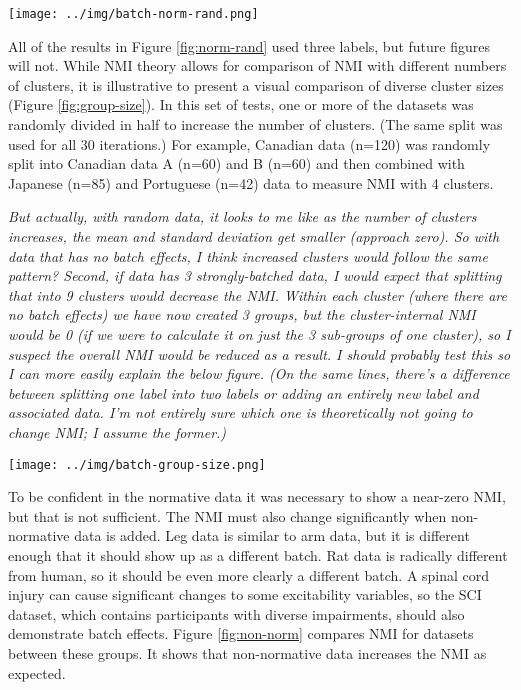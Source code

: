 \documentclass[12pt]{article}
\begin{document}
\begin{figure*}
  \centering
       \texttt{[image: ../img/batch-norm-rand.png]}
  \label{fig:norm-rand}
\end{figure*}

All of the results in Figure \ref{fig:norm-rand} used three labels, but future figures will not. While NMI theory allows for comparison of NMI with different numbers of clusters, it is illustrative to present a visual comparison of diverse cluster sizes (Figure \ref{fig:group-size}). In this set of tests, one or more of the datasets was randomly divided in half to increase the number of clusters. (The same split was used for all 30 iterations.) For example, Canadian data (n=120) was randomly split into Canadian data A (n=60) and B (n=60) and then combined with Japanese (n=85) and Portuguese (n=42) data to measure NMI with 4 clusters.

\emph{But actually, with random data, it looks to me like as the number of clusters increases, the mean and standard deviation get smaller (approach zero). So with data that has no batch effects, I think increased clusters would follow the same pattern? Second, if data has 3 strongly-batched data, I would expect that splitting that into 9 clusters would decrease the NMI. Within each cluster (where there are no batch effects) we have now created 3 groups, but the cluster-internal NMI would be 0 (if we were to calculate it on just the 3 sub-groups of one cluster), so I suspect the overall NMI would be reduced as a result. I should probably test this so I can more easily explain the below figure. (On the same lines, there's a difference between splitting one label into two labels or adding an entirely new label and associated data. I'm not entirely sure which one is theoretically not going to change NMI; I assume the former.)}

\begin{figure*}
  \centering
       \texttt{[image: ../img/batch-group-size.png]}
  \label{fig:group-size}
\end{figure*}

To be confident in the normative data it was necessary to show a near-zero NMI, but that is not sufficient. The NMI must also change significantly when non-normative data is added. Leg data is similar to arm data, but it is different enough that it should show up as a different batch. Rat data is radically different from human, so it should be even more clearly a different batch. A spinal cord injury can cause significant changes to some excitability variables, so the SCI dataset, which contains participants with diverse impairments, should also demonstrate batch effects. Figure \ref{fig:non-norm} compares NMI for datasets between these groups. It shows that non-normative data increases the NMI as expected.
\end{document}
